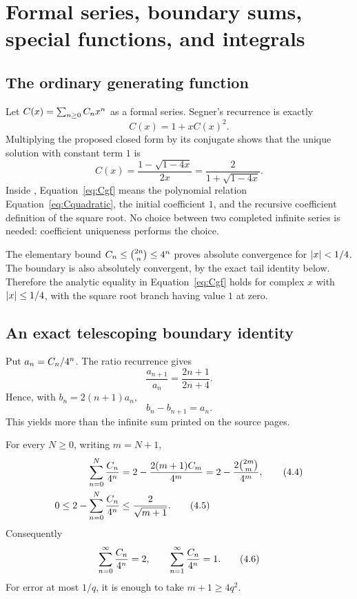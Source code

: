 \section{Formal series, boundary sums, special functions, and integrals}
\label{sec:series}

\subsection{The ordinary generating function}

Let $C(x)=\sum_{n\ge0}C_nx^n$ as a formal series.  Segner's recurrence is
exactly
\[
 C(x)=1+xC(x)^2.                                                  \tag{4.1}\label{eq:Cquadratic}
\]
Multiplying the proposed closed form by its conjugate shows that the unique
solution with constant term $1$ is
\[
 C(x)=\frac{1-\sqrt{1-4x}}{2x}
     =\frac{2}{1+\sqrt{1-4x}}.                                   \tag{4.2}\label{eq:Cgf}
\]
Inside \ipra, Equation~\eqref{eq:Cgf} means the polynomial relation
Equation~\eqref{eq:Cquadratic}, the initial coefficient $1$, and the recursive
coefficient definition of the square root.  No choice between two completed
infinite series is needed: coefficient uniqueness performs the choice.

The elementary bound
\(C_n\le\binom{2n}{n}\le 4^n\) proves absolute convergence for
$\left|x\right|<1/4$.  The boundary is also absolutely convergent, by the exact tail
identity below.  Therefore the analytic equality in Equation~\eqref{eq:Cgf}
holds for complex $x$ with $\left|x\right|\le1/4$, with the square root branch having
value $1$ at zero.

\subsection{An exact telescoping boundary identity}

Put $a_n=C_n/4^n$.  The ratio recurrence gives
\[
 \frac{a_{n+1}}{a_n}=\frac{2n+1}{2n+4}.
\]
Hence, with $b_n=2(n+1)a_n$,
\[
 b_n-b_{n+1}=a_n.                                                 \tag{4.3}\label{eq:telescoping-term}
\]
This yields more than the infinite sum printed on the source pages.

\begin{theorem}
\label{thm:boundary-tail}
For every $N\ge0$, writing $m=N+1$,
\begin{align}
 \sum_{n=0}^{N}\frac{C_n}{4^n}
   &=2-\frac{2(m+1)C_m}{4^m}
    =2-\frac{2\binom{2m}{m}}{4^m},                              \tag{4.4}\label{eq:partial-boundary}\\
 0\le 2-\sum_{n=0}^{N}\frac{C_n}{4^n}
   &\le \frac{2}{\sqrt{m+1}}.                                  \tag{4.5}\label{eq:tail-bound}
\end{align}
Consequently
\[
 \sum_{n=0}^{\infty}\frac{C_n}{4^n}=2,
 \qquad
 \sum_{n=1}^{\infty}\frac{C_n}{4^n}=1.                      \tag{4.6}\label{eq:boundary-sums}
\]
For error at most $1/q$, it is enough to take $m+1\ge4q^2$.
\end{theorem}

